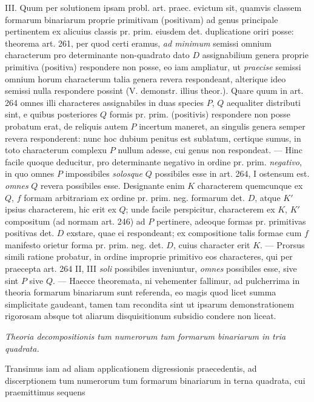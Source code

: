 III. Quum per solutionem ipsam probl. art. praec. evictum sit, quamvis classem formarum binariarum proprie primitivam (positivam) ad genus principale pertinentem ex alicuius classis pr. prim. eiusdem det. duplicatione oriri posse: theorema art. 261, per quod certi eramus, \textit{ad minimum} semissi omnium characterum
pro determinante non-quadrato dato $D$ assignabilium genera proprie primitiva (positiva) respondere non posse, eo iam ampliatur, ut \textit{praecise} semissi omnium horum characterum talia genera revera respondeant, alterique ideo semissi nulla respondere possint (V. demonstr. illius theor.). Quare quum in art. 264 omnes illi characteres assignabiles in duas species $P$, $Q$ aequaliter distributi sint, e quibus posteriores $Q$ formis pr. prim. (positivis) respondere non posse probatum erat, de reliquis autem $P$ incertum maneret, an singulis genera semper revera responderent: nunc hoc dubium penitus est sublatum, certique sumus, in toto characterum complexu $P$ nullum adesse, cui genus non respondeat. --- Hinc facile quoque deducitur, pro determinante negativo in ordine pr. prim. \textit{negativo}, in quo omnes $P$ impossibiles \textit{solosque} $Q$ possibiles esse in art. 264, I ostensum est. \textit{omnes} $Q$ revera possibiles esse. Designante enim $K$ characterem quemcunque ex $Q$, $f$ formam arbitrariam ex ordine pr. prim. neg. formarum det. $D$, atque $K'$ ipsius characterem, hic erit ex $Q$; unde facile perspicitur, characterem ex $K$, $K'$ compositum (ad normam art. 246) ad $P$ pertinere, adeoque formas pr. primitivas positivas det. $D$ exstare, quae ei respondeant; ex compositione talis formae cum $f$ manifesto orietur forma pr. prim. neg. det. $D$, cuius character erit $K$. --- Prorsus simili ratione probatur, in ordine improprie primitivo eos characteres, qui per praecepta art. 264 II, III \textit{soli} possibiles inveniuntur, \textit{omnes} possibiles esse, sive sint $P$ sive $Q$. --- Haecce theoremata, ni vehementer fallimur, ad pulcherrima in theoria formarum binariarum sunt referenda, eo magis quod licet summa simplicitate gaudeant, tamen tam recondita sint ut ipsarum demonstrationem rigorosam absque tot aliarum disquisitionum subsidio condere non liceat.

\begin{center}
\textit{Theoria decompositionis tum numerorum tum formarum binariarum in tria quadrata.}
\end{center}
Transimus iam ad aliam applicationem digressionis praecedentis, ad discerptionem tum numerorum tum formarum binariarum in terna quadrata, cui praemittimus sequens

